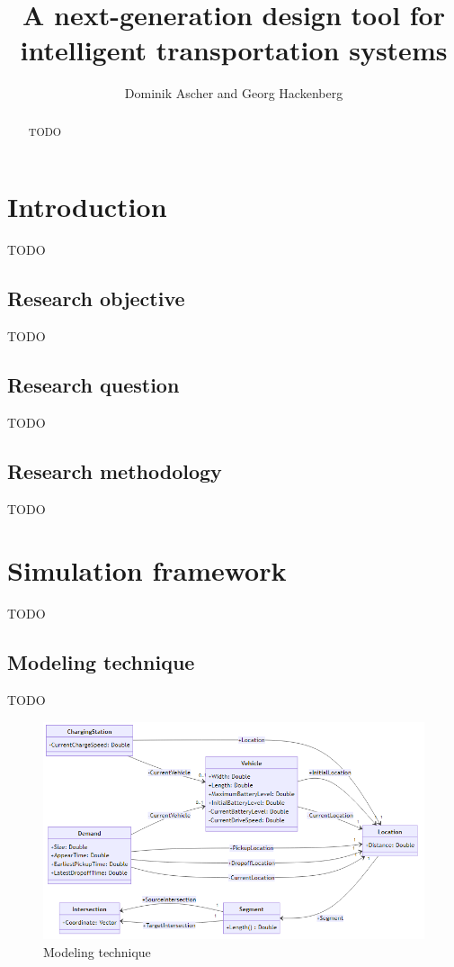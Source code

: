\documentclass[11pt,twocolumn]{article}
\begin{document}
\title{A next-generation design tool for intelligent transportation systems}
\author{Dominik Ascher and Georg Hackenberg}
\maketitle

\begin{abstract}
    TODO
\end{abstract}

\section{Introduction}
\label{sec:introduction}

TODO~\cite{Ascher2014,Ascher2015,Ascher2016}

\subsection{Research objective}

TODO

\subsection{Research question}

TODO

\subsection{Research methodology}

TODO

\section{Simulation framework}
\label{sec:retrospection}

TODO

\subsection{Modeling technique}
\label{sec:modeling-technique}

TODO

\begin{figure}[htbp]
    \includegraphics[width=\columnwidth]{../../diagrams/model/classes-v0.1.png}
    \caption{Modeling technique}
    \label{fig:modeling-technique}
\end{figure}
\end{document}
